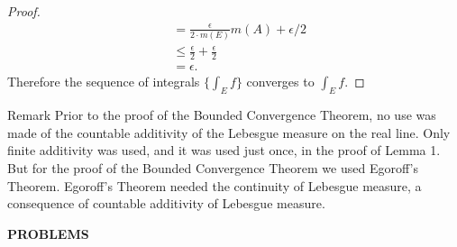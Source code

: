 \begin{flushleft}
\begin{proof}
\begin{align*}
            &=\frac{\epsilon}{2\cdot m(E)}m(A)+\epsilon/2\\
            &\le\frac{\epsilon}{2}+\frac{\epsilon}{2}\\
            &=\epsilon.
        \end{align*}
        Therefore the sequence of integrals $\{\int_Ef\}$ converges to $\int_Ef$.
    \end{proof}
\begin{namedthm*}{Remark}
    Prior to the proof of the Bounded Convergence Theorem, no use was made of the countable additivity of the Lebesgue measure on the real line.
    Only finite additivity was used, and it was used just once, in the proof of Lemma 1. But for the proof of the Bounded Convergence Theorem we used Egoroff's Theorem.
    Egoroff's Theorem needed the continuity of Lebesgue measure, a consequence of countable additivity of Lebesgue measure.    
\end{namedthm*}

\end{flushleft}
\begin{center}
	\textbf{PROBLEMS}
\end{center}
